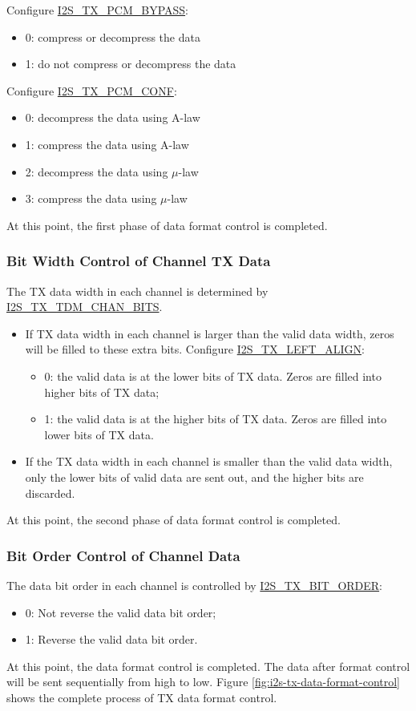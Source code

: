 \documentclass[main\_\_EN.tex]{subfiles}
\begin{document}
Configure \hyperref[fielddesc:I2STXPCMBYPASS]{I2S\_TX\_PCM\_BYPASS}:
\begin{itemize}
\item 0: compress or decompress the data
\item 1: do not compress or decompress the data
\end{itemize}
Configure \hyperref[fielddesc:I2STXPCMCONF]{I2S\_TX\_PCM\_CONF}: 
\begin{itemize}
\item 0: decompress the data using A-law
\item 1: compress the data using A-law
\item 2: decompress the data using $\mu$-law
\item 3: compress the data using $\mu$-law
\end{itemize}
At this point, the first phase of data format control is completed.

\subsubsection{Bit Width Control of Channel TX Data} 
The TX data width in each channel is determined by \hyperref[fielddesc:I2STXTDMCHANBITS]{I2S\_TX\_TDM\_CHAN\_BITS}.

\begin{itemize}
\item If TX data width in each channel is larger than the valid data width, zeros will be filled to these extra bits. Configure  \hyperref[fielddesc:I2STXLEFTALIGN]{I2S\_TX\_LEFT\_ALIGN}:
\begin{itemize}
\item 0: the valid data is at the lower bits of TX data. Zeros are filled into higher bits of TX data;
\item 1: the valid data is at the higher bits of TX data. Zeros are filled into lower bits of TX data.
\end{itemize}
\item If the TX data width in each channel is smaller than the valid data width, only the lower bits of valid data are sent out, and the higher bits are discarded.
\end{itemize}
At this point, the second phase of data format control is completed.

\subsubsection{Bit Order Control of Channel Data}
The data bit order in each channel is controlled by \hyperref[fielddesc:I2STXBITORDER]{I2S\_TX\_BIT\_ORDER}:
\begin{itemize}
\item 0: Not reverse the valid data bit order;
\item 1: Reverse the valid data bit order.
\end{itemize}
At this point, the data format control is completed. The data after format control will be sent sequentially from high to low. Figure \ref{fig:i2s-tx-data-format-control} shows the complete process of TX data format control.
\end{document}
